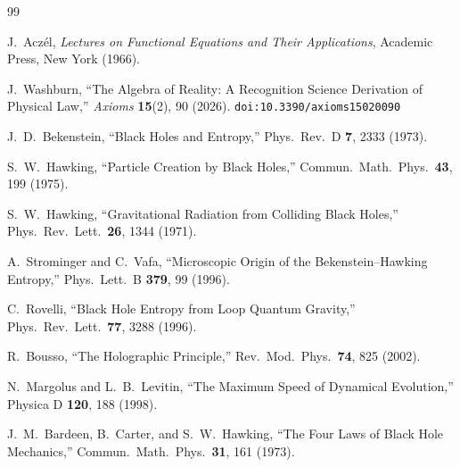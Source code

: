 \documentclass[12pt,a4paper]{article}
\theoremstyle{definition}
\theoremstyle{remark}
\begin{document}
\begin{thebibliography}{99}

J.~Acz\'el, \emph{Lectures on Functional Equations and Their Applications},
Academic Press, New York (1966).

J.~Washburn, ``The Algebra of Reality: A Recognition Science Derivation
of Physical Law,'' \emph{Axioms} \textbf{15}(2), 90 (2026).
\texttt{doi:10.3390/axioms15020090}

J.~D.~Bekenstein, ``Black Holes and Entropy,'' Phys.\ Rev.\ D
\textbf{7}, 2333 (1973).

S.~W.~Hawking, ``Particle Creation by Black Holes,'' Commun.\
Math.\ Phys.\ \textbf{43}, 199 (1975).

S.~W.~Hawking, ``Gravitational Radiation from Colliding Black
Holes,'' Phys.\ Rev.\ Lett.\ \textbf{26}, 1344 (1971).

A.~Strominger and C.~Vafa, ``Microscopic Origin of the
Bekenstein--Hawking Entropy,'' Phys.\ Lett.\ B \textbf{379}, 99
(1996).

C.~Rovelli, ``Black Hole Entropy from Loop Quantum Gravity,''
Phys.\ Rev.\ Lett.\ \textbf{77}, 3288 (1996).

R.~Bousso, ``The Holographic Principle,'' Rev.\ Mod.\ Phys.\
\textbf{74}, 825 (2002).

N.~Margolus and L.~B.~Levitin, ``The Maximum Speed of Dynamical
Evolution,'' Physica D \textbf{120}, 188 (1998).

J.~M.~Bardeen, B.~Carter, and S.~W.~Hawking, ``The Four Laws
of Black Hole Mechanics,'' Commun.\ Math.\ Phys.\ \textbf{31},
161 (1973).

\end{thebibliography}
\end{document}
